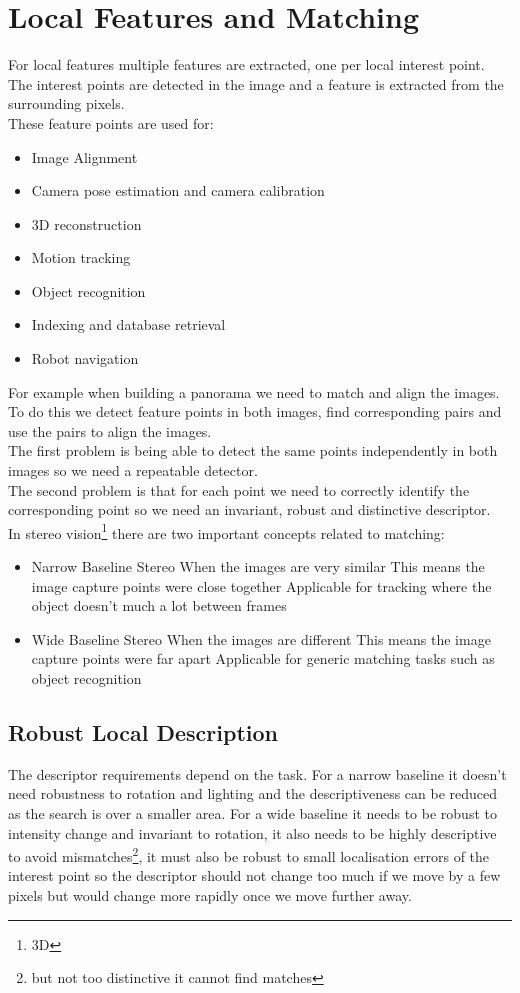 \documentclass{article}
\begin{document}
	\section{Local Features and Matching}
	For local features multiple features are extracted, one per local interest point. The interest points are detected in the image and a feature is extracted from the surrounding pixels.\\
	These feature points are used for:
	\begin{itemize}
		\item Image Alignment
		\item Camera pose estimation and camera calibration
		\item 3D reconstruction
		\item Motion tracking
		\item Object recognition
		\item Indexing and database retrieval
		\item Robot navigation
	\end{itemize}
	For example when building a panorama we need to match and align the images. To do this we detect feature points in both images, find corresponding pairs and use the pairs to align the images.\\
	The first problem is being able to detect the same points independently in both images so we need a repeatable detector.\\
	The second problem is that for each point we need to correctly identify the corresponding point so we need an invariant, robust and distinctive descriptor.\\
	In stereo vision\footnote{3D} there are two important concepts related to matching:
	\begin{itemize}
		\item Narrow Baseline Stereo
		\subitem When the images are very similar
		\subitem This means the image capture points were close together
		\subitem Applicable for tracking where the object doesn't much a lot between frames
		\item Wide Baseline Stereo
		\subitem When the images are different
		\subitem This means the image capture points were far apart
		\subitem Applicable for generic matching tasks such as object recognition
	\end{itemize}
	\subsection{Robust Local Description}
	The descriptor requirements depend on the task. For a narrow baseline it doesn't need robustness to rotation and lighting and the descriptiveness can be reduced as the search is over a smaller area. For a wide baseline it needs to be robust to intensity change and invariant to rotation, it also needs to be highly descriptive to avoid mismatches\footnote{but not too distinctive it cannot find matches}, it must also be robust to small localisation errors of the interest point so the descriptor should not change too much if we move by a few pixels but would change more rapidly once we move further away.
\end{document}
